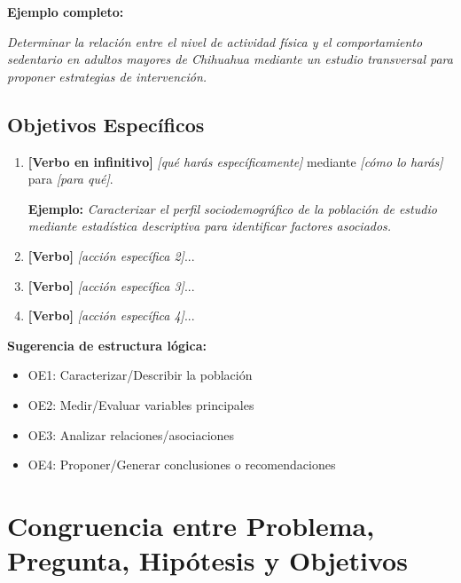 \textbf{Ejemplo completo:}

\textit{Determinar la relación entre el nivel de actividad física y el comportamiento sedentario en adultos mayores de Chihuahua mediante un estudio transversal para proponer estrategias de intervención.}

\subsection{Objetivos Específicos}
\label{subsec:objetivos_especificos}


\begin{enumerate}[label=\textbf{OE\arabic*:}]
    \item \textbf{[Verbo en infinitivo]} \textit{[qué harás específicamente]} mediante \textit{[cómo lo harás]} para \textit{[para qué]}.
    
    \textbf{Ejemplo:} \textit{Caracterizar el perfil sociodemográfico de la población de estudio mediante estadística descriptiva para identificar factores asociados.}
    
    \item \textbf{[Verbo]} \textit{[acción específica 2]}...
    
    \item \textbf{[Verbo]} \textit{[acción específica 3]}...
    
    \item \textbf{[Verbo]} \textit{[acción específica 4]}...
\end{enumerate}

\textbf{Sugerencia de estructura lógica:}
\begin{itemize}
    \item OE1: Caracterizar/Describir la población
    \item OE2: Medir/Evaluar variables principales
    \item OE3: Analizar relaciones/asociaciones
    \item OE4: Proponer/Generar conclusiones o recomendaciones
\end{itemize}

\section{Congruencia entre Problema, Pregunta, Hipótesis y Objetivos}
\label{sec:congruencia}

